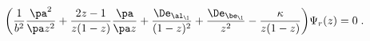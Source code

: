 \begin{equation}
\bigg(\frac{1}{b^2}\frac{\pa^2}{\pa z^2}+
\frac{2z-1}{z(1-z)}\frac{\pa}{\pa z}+\frac{\De_{\al_\1}}{(1-z)^2}+
\frac{\De_{\be_\1}}{z^2} -\frac{\kappa}{z(1-z)}\bigg)\Psi_r(z)=0\;.
\end{equation}


